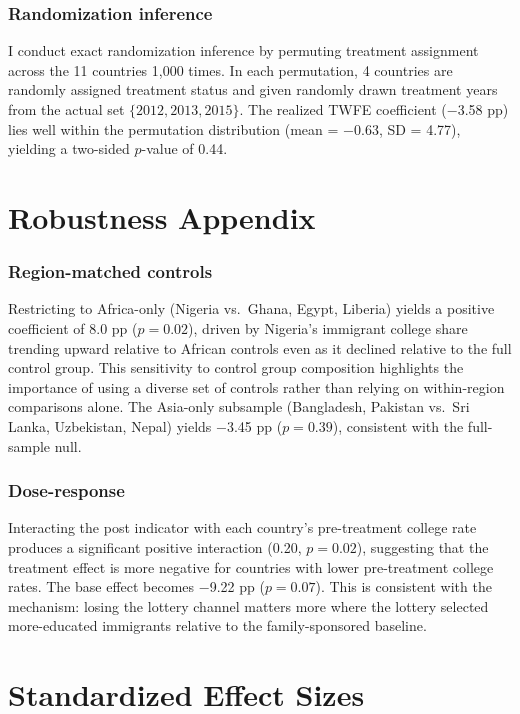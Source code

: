 \documentclass[12pt]{article}
\begin{document}
\subsubsection*{Randomization inference} I conduct exact randomization inference by permuting treatment assignment across the 11 countries 1,000 times. In each permutation, 4 countries are randomly assigned treatment status and given randomly drawn treatment years from the actual set $\{2012, 2013, 2015\}$. The realized TWFE coefficient ($-$3.58 pp) lies well within the permutation distribution (mean = $-$0.63, SD = 4.77), yielding a two-sided $p$-value of 0.44.

\section{Robustness Appendix}

\subsubsection*{Region-matched controls} Restricting to Africa-only (Nigeria vs.\ Ghana, Egypt, Liberia) yields a positive coefficient of 8.0 pp ($p = 0.02$), driven by Nigeria's immigrant college share trending upward relative to African controls even as it declined relative to the full control group. This sensitivity to control group composition highlights the importance of using a diverse set of controls rather than relying on within-region comparisons alone. The Asia-only subsample (Bangladesh, Pakistan vs.\ Sri Lanka, Uzbekistan, Nepal) yields $-$3.45 pp ($p = 0.39$), consistent with the full-sample null.

\subsubsection*{Dose-response} Interacting the post indicator with each country's pre-treatment college rate produces a significant positive interaction (0.20, $p = 0.02$), suggesting that the treatment effect is more negative for countries with lower pre-treatment college rates. The base effect becomes $-$9.22 pp ($p = 0.07$). This is consistent with the mechanism: losing the lottery channel matters more where the lottery selected more-educated immigrants relative to the family-sponsored baseline.

\section{Standardized Effect Sizes}
\label{sec:sde}


\end{document}
